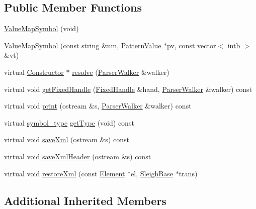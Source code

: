 \subsection*{Public Member Functions}
\begin{DoxyCompactItemize}
\item 
\mbox{\hyperlink{class_value_map_symbol_ad4f0eeb5f24d1859e90016d4807d3d31}{Value\+Map\+Symbol}} (void)
\item 
\mbox{\hyperlink{class_value_map_symbol_a9dd3d3fd297fe8028dce8f357f0a57db}{Value\+Map\+Symbol}} (const string \&nm, \mbox{\hyperlink{class_pattern_value}{Pattern\+Value}} $\ast$pv, const vector$<$ \mbox{\hyperlink{types_8h_aa925ba3e627c2df89d5b1cfe84fb8572}{intb}} $>$ \&vt)
\item 
virtual \mbox{\hyperlink{class_constructor}{Constructor}} $\ast$ \mbox{\hyperlink{class_value_map_symbol_a7287386595bd0d870f78e83490637c53}{resolve}} (\mbox{\hyperlink{class_parser_walker}{Parser\+Walker}} \&walker)
\item 
virtual void \mbox{\hyperlink{class_value_map_symbol_a78aaab9818d7d20cbae621581b99894c}{get\+Fixed\+Handle}} (\mbox{\hyperlink{struct_fixed_handle}{Fixed\+Handle}} \&hand, \mbox{\hyperlink{class_parser_walker}{Parser\+Walker}} \&walker) const
\item 
virtual void \mbox{\hyperlink{class_value_map_symbol_a706eaaae2c92d3927855bc34d10f2cc1}{print}} (ostream \&s, \mbox{\hyperlink{class_parser_walker}{Parser\+Walker}} \&walker) const
\item 
virtual \mbox{\hyperlink{class_sleigh_symbol_aba70f7f332fd63488c5ec4bd7807db41}{symbol\+\_\+type}} \mbox{\hyperlink{class_value_map_symbol_a5a24c6e3381760dad97f55c929de81f3}{get\+Type}} (void) const
\item 
virtual void \mbox{\hyperlink{class_value_map_symbol_aacceef585b6af757603b310a7173b860}{save\+Xml}} (ostream \&s) const
\item 
virtual void \mbox{\hyperlink{class_value_map_symbol_a11fcdd4ed7bb9ede9c5bb407436b85bf}{save\+Xml\+Header}} (ostream \&s) const
\item 
virtual void \mbox{\hyperlink{class_value_map_symbol_a713f4ece8b103374e08d4b53f9ef174b}{restore\+Xml}} (const \mbox{\hyperlink{class_element}{Element}} $\ast$el, \mbox{\hyperlink{class_sleigh_base}{Sleigh\+Base}} $\ast$trans)
\end{DoxyCompactItemize}
\subsection*{Additional Inherited Members}


